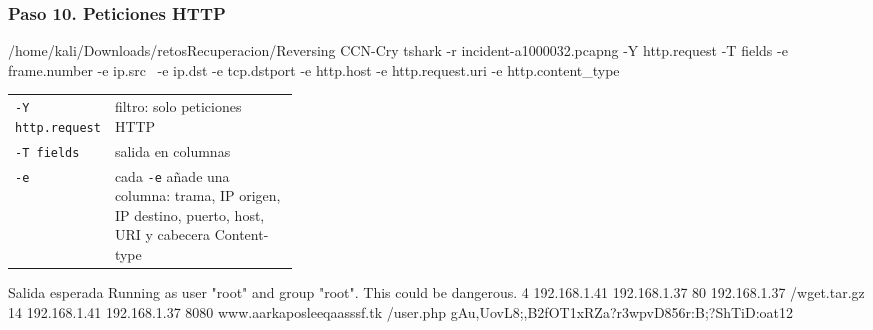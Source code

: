 \documentclass[11pt,a4paper]{article}
\begin{document}
\subsubsection*{Paso 10. Peticiones HTTP}
\begin{comando}{/home/kali/Downloads/retosRecuperacion/Reversing CCN-Cry}
tshark -r incident-a1000032.pcapng -Y http.request -T fields -e frame.number -e ip.src \
  -e ip.dst -e tcp.dstport -e http.host -e http.request.uri -e http.content_type
\end{comando}
\begin{tcolorbox}[enhanced, breakable, colback=white, colframe=gray!40, boxrule=0.3pt, arc=1pt, left=4pt, right=4pt, top=2pt, bottom=2pt, fonttitle=\sffamily\scriptsize\bfseries, coltitle=black!75, colbacktitle=gray!8, title={Qué hace cada parte}, attach title to upper, before skip=2pt, after skip=4pt, fontupper=\small]
\par{\renewcommand{\arraystretch}{1.12}\begin{tabularx}{\linewidth}{@{}>{\raggedright\arraybackslash}p{0.33\linewidth}>{\raggedright\arraybackslash}X@{}}
\texttt{-Y http.request} & filtro: solo peticiones HTTP \\
\texttt{-T fields} & salida en columnas \\
\texttt{-e} & cada \texttt{-e} añade una columna: trama, IP origen, IP destino, puerto, host, URI y cabecera Content-type \\
\end{tabularx}}
\end{tcolorbox}
\begin{salidan}{Salida esperada}
Running as user "root" and group "root". This could be dangerous.
4       192.168.1.41    192.168.1.37    80      192.168.1.37    /wget.tar.gz    
14      192.168.1.41    192.168.1.37    8080    www.aarkaposleeqaasssf.tk       /user.php       gAu,UovL8;,B2fOT1xRZa?r3wpvD856r:B;?ShTiD:oat12
\end{salidan}
\end{document}
